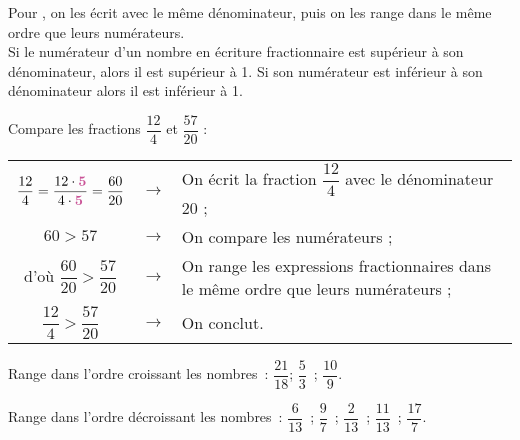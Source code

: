
\newpage


\begin{aconnaitre}
Pour , on les écrit avec le même dénominateur, puis on les range dans le même ordre que leurs numérateurs. \\[0.5em]
Si le numérateur d'un nombre en écriture fractionnaire est supérieur à son dénominateur, alors il est supérieur à 1. Si son numérateur est inférieur à son dénominateur alors il est inférieur à 1.
\end{aconnaitre}


\begin{methode*1}[Comparer]

\begin{exemple*1}
Compare les fractions $\dfrac{12}{4}$ et $\dfrac{57}{20}$ :
\begin{center}
 \begin{tabularx}{\linewidth}{ccX}
  $\dfrac{12}{4} = \dfrac{12 \cdot \text{\textbf{\textcolor{C2}{5}}}}{4 \cdot \text{\textbf{\textcolor{C2}{5}}}} = \dfrac{60}{20}$ & $\rightarrow$ & On écrit la fraction $\dfrac{12}{4}$ avec le dénominateur 20 ; \\
  $60 > 57$ & $\rightarrow$ & On compare les numérateurs ; \\[0.5em]
  d'où $\dfrac{60}{20} > \dfrac{57}{20}$ & $\rightarrow$ & On range les expressions fractionnaires dans le même ordre que leurs numérateurs ; \\ 
  $\dfrac{12}{4} > \dfrac{57}{20}$ & $\rightarrow$ & On conclut. \\
  \end{tabularx}
\end{center}
 \end{exemple*1}
 
  \exercice
Range dans l'ordre croissant les nombres : $\dfrac{21}{18}$; $\dfrac{5}{3}$ ; $\dfrac{10}{9}$.

  \exercice
Range dans l'ordre décroissant les nombres : $\dfrac{6}{13}$ ; $\dfrac{9}{7}$ ; $\dfrac{2}{13}$ ; $\dfrac{11}{13}$ ; $\dfrac{17}{7}$.

 \end{methode*1}

